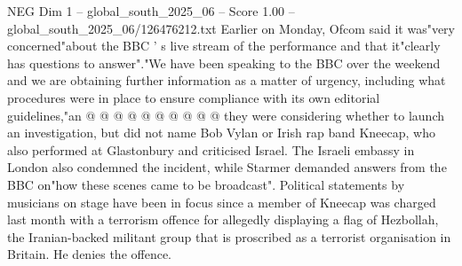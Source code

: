 \begin{textsample}{NEG Dim 1 – global\_south\_2025\_06 – Score 1.00 – global\_south\_2025\_06/126476212.txt}
Earlier on Monday, Ofcom said it was"very concerned"about the BBC ' s live stream of the performance and that it"clearly has questions to answer"."We have been speaking to the BBC over the weekend and we are obtaining further information as a matter of urgency, including what procedures were in place to ensure compliance with its own editorial guidelines,"an @ @ @ @ @ @ @ @ @ @ they were considering whether to launch an investigation, but did not name Bob Vylan or Irish rap band Kneecap, who also performed at Glastonbury and criticised Israel.
The Israeli embassy in London also condemned the incident, while Starmer demanded answers from the BBC on"how these scenes came to be broadcast".
Political statements by musicians on stage have been in focus since a member of Kneecap was charged last month with a terrorism offence for allegedly displaying a flag of Hezbollah, the Iranian-backed militant group that is proscribed as a terrorist organisation in Britain.
He denies the offence.

\end{textsample}
